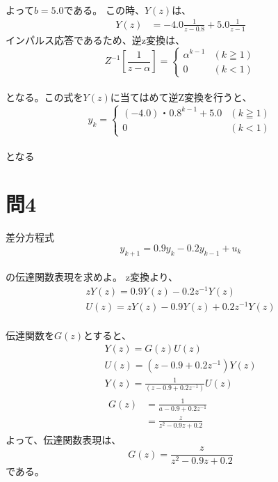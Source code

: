 \documentclass[a4paper,11pt]{ltjsarticle}
\begin{document}
\\よって$b = 5.0$である。
この時、$Y(z)$は、
\begin{equation*}
  \begin{split}
    Y(z)
    &= -4.0\frac{1}{z-0.8} + 5.0 \frac{1}{z-1}
  \end{split}
\end{equation*}
インパルス応答であるため、逆z変換は、
\begin{equation*}
  Z^{-1}\left[\frac{1}{z-\alpha}\right] =
  \begin{cases*}
    \alpha^{k-1} & (k \geqq 1) \\
    0 & (k < 1)
  \end{cases*}
\end{equation*}
\\となる。この式を$Y(z)$に当てはめて逆Z変換を行うと、
\begin{equation*}
  y_{k}=
  \begin{cases*}
    (-4.0) ・ 0.8^{k-1} + 5.0 & (k \geqq 1) \\
    0 & (k < 1)
  \end{cases*}
\end{equation*}
\\となる
\section*{問4}
差分方程式
\begin{equation*}
  y_{k+1} = 0.9y_{k} - 0.2y_{k-1} + u_{k}
\end{equation*}
\\の伝達関数表現を求めよ。
z変換より、
\begin{gather*}
  zY(z) = 0.9Y(z) - 0.2z^{-1}Y(z) \\
  U(z) = zY(z) - 0.9Y(z) + 0.2z^{-1}Y(z)
\end{gather*}
\\伝達関数を$G(z)$とすると、
\begin{gather*}
  Y(z) = G(z)U(z) \\
  U(z) = (z - 0.9 + 0.2z^{-1})Y(z) \\
  Y(z) = \frac{1}{(z - 0.9 + 0.2z^{-1})}U(z) \\
  \begin{split}
    G(z)
    &= \frac{1}{a-0.9+0.2z^{-1}} \\
    &= \frac{z}{z^{2}-0.9z+0.2}
  \end{split}
\end{gather*}
  よって、伝達関数表現は、
  \begin{equation*}
    G(z) = \frac{z}{z^{2}-0.9z+0.2}
  \end{equation*}
  である。
\end{document}
